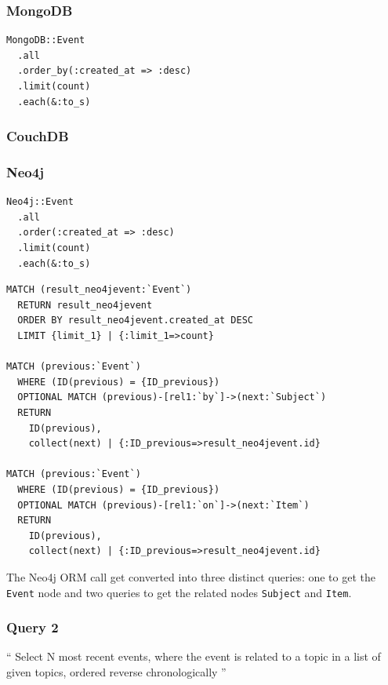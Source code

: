 \subsubsection*{MongoDB}

\begin{verbatim}
MongoDB::Event
  .all
  .order_by(:created_at => :desc)
  .limit(count)
  .each(&:to_s)
\end{verbatim}

\subsubsection*{CouchDB}


\subsubsection*{Neo4j}

\begin{verbatim}
Neo4j::Event
  .all
  .order(:created_at => :desc)
  .limit(count)
  .each(&:to_s)
\end{verbatim}

\begin{verbatim}
MATCH (result_neo4jevent:`Event`)
  RETURN result_neo4jevent
  ORDER BY result_neo4jevent.created_at DESC
  LIMIT {limit_1} | {:limit_1=>count}

MATCH (previous:`Event`)
  WHERE (ID(previous) = {ID_previous})
  OPTIONAL MATCH (previous)-[rel1:`by`]->(next:`Subject`)
  RETURN
    ID(previous),
    collect(next) | {:ID_previous=>result_neo4jevent.id}

MATCH (previous:`Event`)
  WHERE (ID(previous) = {ID_previous})
  OPTIONAL MATCH (previous)-[rel1:`on`]->(next:`Item`)
  RETURN
    ID(previous),
    collect(next) | {:ID_previous=>result_neo4jevent.id}
\end{verbatim}

The Neo4j ORM call get converted into three distinct queries: one to get the \texttt{Event} node and two queries to get the related nodes \texttt{Subject} and \texttt{Item}.

\subsubsection{Query 2}
\label{subsubsec:query-2}

``
Select N most recent events, where the event is related to a topic in a list of given topics, ordered reverse chronologically
''

